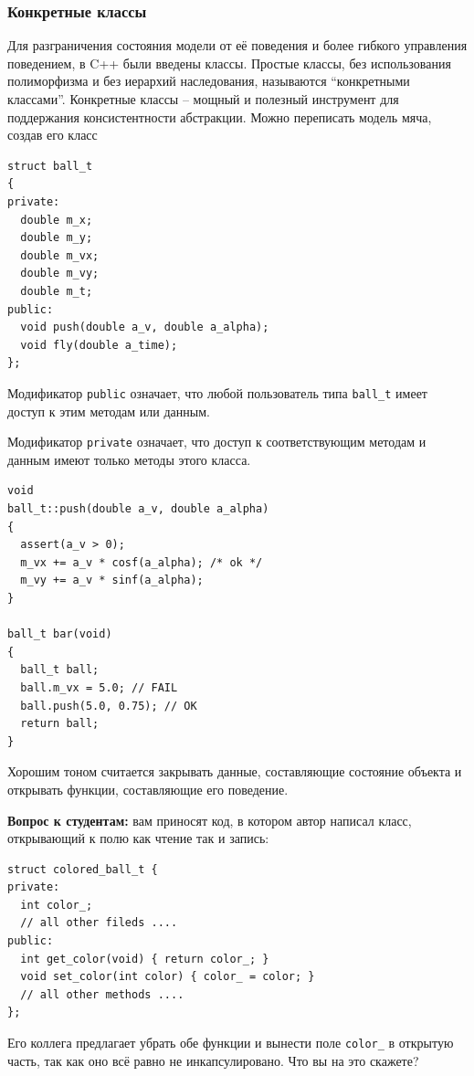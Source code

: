 \documentclass[a4paper,12pt,oneside]{article}
\begin{document}
\subsubsection{Конкретные классы}\label{ConcreteClasses}

Для разграничения состояния модели от её поведения и более гибкого управления поведением, в C++ были введены классы. Простые классы, без использования полиморфизма и без иерархий наследования, называются ``конкретными классами''. Конкретные классы -- мощный и полезный инструмент для поддержания консистентности абстракции. Можно переписать модель мяча, создав его класс

\begin{lstlisting}
struct ball_t
{
private:
  double m_x;
  double m_y;
  double m_vx;
  double m_vy;
  double m_t;
public:
  void push(double a_v, double a_alpha);
  void fly(double a_time);
};
\end{lstlisting}

Модификатор \lstinline!public! означает, что любой пользователь типа \lstinline!ball_t! имеет доступ к этим методам или данным. 

Модификатор \lstinline!private! означает, что доступ к соответствующим методам и данным имеют только методы этого класса.

\begin{lstlisting}
void
ball_t::push(double a_v, double a_alpha)
{
  assert(a_v > 0);
  m_vx += a_v * cosf(a_alpha); /* ok */
  m_vy += a_v * sinf(a_alpha);
}

ball_t bar(void)
{
  ball_t ball;
  ball.m_vx = 5.0; // FAIL
  ball.push(5.0, 0.75); // OK
  return ball;
}
\end{lstlisting}

Хорошим тоном считается закрывать данные, составляющие состояние объекта и открывать функции, составляющие его поведение.

\textbf{Вопрос к студентам:} вам приносят код, в котором автор написал класс, открывающий к полю как чтение так и запись:

\begin{lstlisting}
struct colored_ball_t {
private:
  int color_;
  // all other fileds ....
public:
  int get_color(void) { return color_; }
  void set_color(int color) { color_ = color; }
  // all other methods ....
};
\end{lstlisting}

Его коллега предлагает убрать обе функции и вынести поле \lstinline!color_! в открытую часть, так как оно всё равно не инкапсулировано. Что вы на это скажете?
\end{document}
